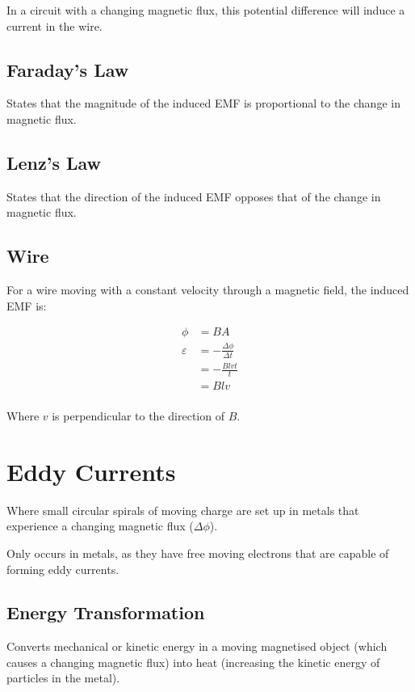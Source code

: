 \documentclass[a4paper,11pt]{article}
\begin{document}
In a circuit with a changing magnetic flux, this potential difference will
induce a current in the wire.


\subsection{Faraday's Law}

States that the magnitude of the induced EMF is proportional to the change in
magnetic flux.


\subsection{Lenz's Law}

States that the direction of the induced EMF opposes that of the change in
magnetic flux.


\subsection{Wire}

For a wire moving with a constant velocity through a magnetic field, the induced
EMF is:

$$
\begin{aligned}
\phi & = BA \\
\varepsilon & = -\frac{\Delta \phi}{\Delta t} \\
& = -\frac{Blvt}{t} \\
& = Blv \\
\end{aligned}
$$

Where $v$ is perpendicular to the direction of $B$.




\section{Eddy Currents}

Where small circular spirals of moving charge are set up in metals that
experience a changing magnetic flux ($\Delta \phi$).

Only occurs in metals, as they have free moving electrons that are capable of
forming eddy currents.


\subsection{Energy Transformation}

Converts mechanical or kinetic energy in a moving magnetised object (which
causes a changing magnetic flux) into heat (increasing the kinetic energy of
particles in the metal).
\end{document}
